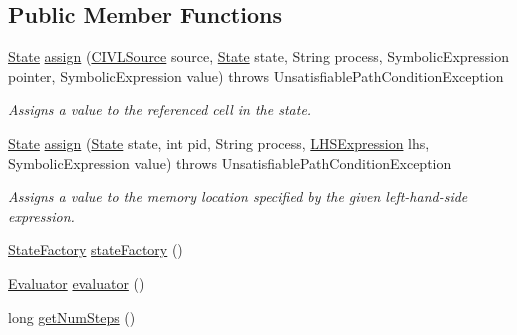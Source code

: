 \subsection*{Public Member Functions}
\begin{DoxyCompactItemize}
\item 
\hyperlink{interfaceedu_1_1udel_1_1cis_1_1vsl_1_1civl_1_1state_1_1IF_1_1State}{State} \hyperlink{interfaceedu_1_1udel_1_1cis_1_1vsl_1_1civl_1_1semantics_1_1IF_1_1Executor_a641d7b8c23c29c8c890124d3f36c25f7}{assign} (\hyperlink{interfaceedu_1_1udel_1_1cis_1_1vsl_1_1civl_1_1model_1_1IF_1_1CIVLSource}{C\+I\+V\+L\+Source} source, \hyperlink{interfaceedu_1_1udel_1_1cis_1_1vsl_1_1civl_1_1state_1_1IF_1_1State}{State} state, String process, Symbolic\+Expression pointer, Symbolic\+Expression value)  throws Unsatisfiable\+Path\+Condition\+Exception
\begin{DoxyCompactList}\small\item\em Assigns a value to the referenced cell in the state. \end{DoxyCompactList}\item 
\hyperlink{interfaceedu_1_1udel_1_1cis_1_1vsl_1_1civl_1_1state_1_1IF_1_1State}{State} \hyperlink{interfaceedu_1_1udel_1_1cis_1_1vsl_1_1civl_1_1semantics_1_1IF_1_1Executor_a05284edbb0f6af6f5203b4591095a1c4}{assign} (\hyperlink{interfaceedu_1_1udel_1_1cis_1_1vsl_1_1civl_1_1state_1_1IF_1_1State}{State} state, int pid, String process, \hyperlink{interfaceedu_1_1udel_1_1cis_1_1vsl_1_1civl_1_1model_1_1IF_1_1expression_1_1LHSExpression}{L\+H\+S\+Expression} lhs, Symbolic\+Expression value)  throws Unsatisfiable\+Path\+Condition\+Exception
\begin{DoxyCompactList}\small\item\em Assigns a value to the memory location specified by the given left-\/hand-\/side expression. \end{DoxyCompactList}\item 
\hyperlink{interfaceedu_1_1udel_1_1cis_1_1vsl_1_1civl_1_1state_1_1IF_1_1StateFactory}{State\+Factory} \hyperlink{interfaceedu_1_1udel_1_1cis_1_1vsl_1_1civl_1_1semantics_1_1IF_1_1Executor_a13ec8800fe1e89fd4292331bd79da81d}{state\+Factory} ()
\item 
\hyperlink{interfaceedu_1_1udel_1_1cis_1_1vsl_1_1civl_1_1semantics_1_1IF_1_1Evaluator}{Evaluator} \hyperlink{interfaceedu_1_1udel_1_1cis_1_1vsl_1_1civl_1_1semantics_1_1IF_1_1Executor_a7abfbd56f78080512030ce12ce3cc539}{evaluator} ()
\item 
long \hyperlink{interfaceedu_1_1udel_1_1cis_1_1vsl_1_1civl_1_1semantics_1_1IF_1_1Executor_a7332dc921fd2735fff3a2d356dd8c23e}{get\+Num\+Steps} ()

\end{DoxyCompactItemize}
